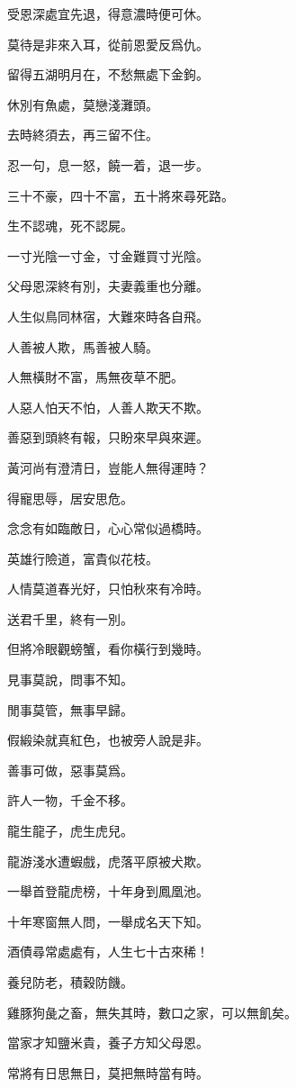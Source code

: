 \documentclass[12pt,a4paper]{ctexbook}
\begin{document}
受恩深處宜先退，得意濃時便可休。\par
莫待是非來入耳，從前恩愛反爲仇。\par
留得五湖明月在，不愁無處下金鉤。\par
休別有魚處，莫戀淺灘頭。\par
去時終須去，再三留不住。\par
忍一句，息一怒，饒一着，退一步。\par
三十不豪，四十不富，五十將來尋死路。\par
生不認魂，死不認屍。\par
一寸光陰一寸金，寸金難買寸光陰。\par
父母恩深終有別，夫妻義重也分離。\par
人生似鳥同林宿，大難來時各自飛。\par
人善被人欺，馬善被人騎。\par
人無橫財不富，馬無夜草不肥。\par
人惡人怕天不怕，人善人欺天不欺。\par
善惡到頭終有報，只盼來早與來遲。\par
黃河尚有澄清日，豈能人無得運時？\par
得寵思辱，居安思危。\par
念念有如臨敵日，心心常似過橋時。\par
英雄行險道，富貴似花枝。\par
人情莫道春光好，只怕秋來有冷時。\par
送君千里，終有一別。\par
但將冷眼觀螃蟹，看你橫行到幾時。\par
見事莫說，問事不知。\par
閒事莫管，無事早歸。\par
假緞染就真紅色，也被旁人說是非。\par
善事可做，惡事莫爲。\par
許人一物，千金不移。\par
龍生龍子，虎生虎兒。\par
龍游淺水遭蝦戲，虎落平原被犬欺。\par
一舉首登龍虎榜，十年身到鳳凰池。\par
十年寒窗無人問，一舉成名天下知。\par
酒債尋常處處有，人生七十古來稀！\par
養兒防老，積穀防饑。\par
雞豚狗彘之畜，無失其時，數口之家，可以無飢矣。\par
當家才知鹽米貴，養子方知父母恩。\par
常將有日思無日，莫把無時當有時。\par
\end{document}
